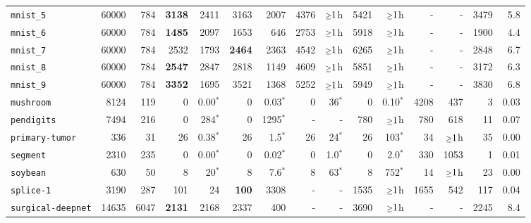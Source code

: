 \begin{tabular}{lccrrrrrrrrrrrr}
\texttt{mnist\_5} & \multicolumn{1}{r}{60000} & \multicolumn{1}{r}{784}  & \textbf{3138} & 2411 & 3163 & 2007 & 4376 & $\mathsmaller{\geq}1$h & 5421 & $\mathsmaller{\geq}1$h & - & - & 3479 & 5.8\\
\texttt{mnist\_6} & \multicolumn{1}{r}{60000} & \multicolumn{1}{r}{784}  & \textbf{1485} & 2097 & 1653 & 646 & 2753 & $\mathsmaller{\geq}1$h & 5918 & $\mathsmaller{\geq}1$h & - & - & 1900 & 4.4\\
\texttt{mnist\_7} & \multicolumn{1}{r}{60000} & \multicolumn{1}{r}{784}  & 2532 & 1793 & \textbf{2464} & 2363 & 4542 & $\mathsmaller{\geq}1$h & 6265 & $\mathsmaller{\geq}1$h & - & - & 2848 & 6.7\\
\texttt{mnist\_8} & \multicolumn{1}{r}{60000} & \multicolumn{1}{r}{784}  & \textbf{2547} & 2847 & 2818 & 1149 & 4609 & $\mathsmaller{\geq}1$h & 5851 & $\mathsmaller{\geq}1$h & - & - & 3172 & 6.3\\
\texttt{mnist\_9} & \multicolumn{1}{r}{60000} & \multicolumn{1}{r}{784}  & \textbf{3352} & 1695 & 3521 & 1368 & 5252 & $\mathsmaller{\geq}1$h & 5949 & $\mathsmaller{\geq}1$h & - & - & 3830 & 6.8\\
\texttt{mushroom} & \multicolumn{1}{r}{8124} & \multicolumn{1}{r}{119}  & 0 & 0.00$^*$ & 0 & 0.03$^*$ & 0 & 36$^*$ & 0 & 0.10$^*$ & 4208 & 437 & 3 & 0.03\\
\texttt{pendigits} & \multicolumn{1}{r}{7494} & \multicolumn{1}{r}{216}  & 0 & 284$^*$ & 0 & 1295$^*$ & - & - & 780 & $\mathsmaller{\geq}1$h & 780 & 618 & 11 & 0.07\\
\texttt{primary-tumor} & \multicolumn{1}{r}{336} & \multicolumn{1}{r}{31}  & 26 & 0.38$^*$ & 26 & 1.5$^*$ & 26 & 24$^*$ & 26 & 103$^*$ & 34 & $\mathsmaller{\geq}1$h & 35 & 0.00\\
\texttt{segment} & \multicolumn{1}{r}{2310} & \multicolumn{1}{r}{235}  & 0 & 0.00$^*$ & 0 & 0.02$^*$ & 0 & 1.0$^*$ & 0 & 2.0$^*$ & 330 & 1053 & 1 & 0.01\\
\texttt{soybean} & \multicolumn{1}{r}{630} & \multicolumn{1}{r}{50}  & 8 & 20$^*$ & 8 & 7.6$^*$ & 8 & 63$^*$ & 8 & 752$^*$ & 14 & $\mathsmaller{\geq}1$h & 23 & 0.00\\
\texttt{splice-1} & \multicolumn{1}{r}{3190} & \multicolumn{1}{r}{287}  & 101 & 24 & \textbf{100} & 3308 & - & - & 1535 & $\mathsmaller{\geq}1$h & 1655 & 542 & 117 & 0.04\\
\texttt{surgical-deepnet} & \multicolumn{1}{r}{14635} & \multicolumn{1}{r}{6047}  & \textbf{2131} & 2168 & 2337 & 400 & - & - & 3690 & $\mathsmaller{\geq}1$h & - & - & 2245 & 8.4\\

\end{tabular}
